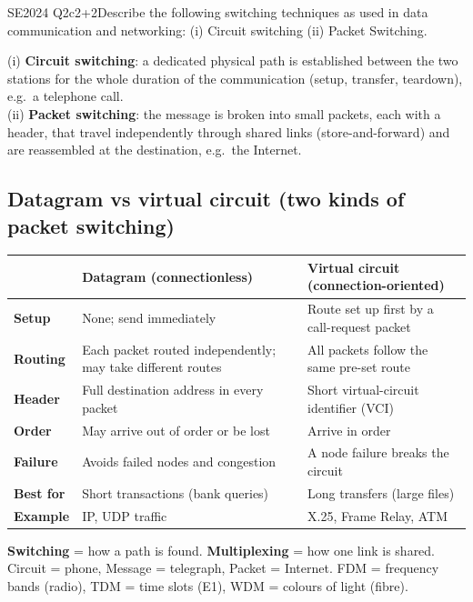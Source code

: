 \documentclass[10pt]{article}
\begin{document}
\begin{pastq}{SE2024 Q2c}{2+2}Describe the following switching techniques as used in data communication and networking: (i) Circuit switching (ii) Packet Switching.\end{pastq}
\begin{ans}
(i) \textbf{Circuit switching}: a dedicated physical path is established between the two stations for the whole duration of the communication (setup, transfer, teardown), e.g.\ a telephone call.\\
(ii) \textbf{Packet switching}: the message is broken into small packets, each with a header, that travel independently through shared links (store-and-forward) and are reassembled at the destination, e.g.\ the Internet.
\end{ans}

\subsection{Datagram vs virtual circuit (two kinds of packet switching)}
\begin{center}\small
\begin{tabularx}{\linewidth}{@{}>{\bfseries}lXX@{}}
\toprule
 & Datagram (connectionless) & Virtual circuit (connection-oriented)\\\midrule
Setup & None; send immediately & Route set up first by a call-request packet\\
Routing & Each packet routed independently; may take different routes & All packets follow the same pre-set route\\
Header & Full destination address in every packet & Short virtual-circuit identifier (VCI)\\
Order & May arrive out of order or be lost & Arrive in order\\
Failure & Avoids failed nodes and congestion & A node failure breaks the circuit\\
Best for & Short transactions (bank queries) & Long transfers (large files)\\
Example & IP, UDP traffic & X.25, Frame Relay, ATM\\
\bottomrule
\end{tabularx}
\end{center}

\begin{mnemonic}
\textbf{Switching} = how a path is found. \textbf{Multiplexing} = how one link is shared.
Circuit = phone, Message = telegraph, Packet = Internet. FDM = frequency bands (radio), TDM = time slots (E1), WDM = colours of light (fibre).
\end{mnemonic}
\end{document}
